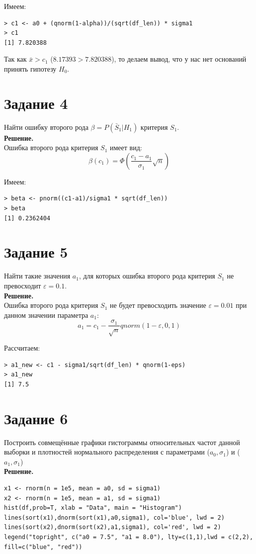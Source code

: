 \documentclass[14pt,a4paper]{scrartcl}
\begin{document}
Имеем:
\begin{verbatim}
> c1 <- a0 + (qnorm(1-alpha))/(sqrt(df_len)) * sigma1
> c1
[1] 7.820388
\end{verbatim}

Так как $\bar{x} > c_1$ ($8.17393 > 7.820388$), то делаем вывод, что у нас нет оснований принять гипотезу $H_0$.


\section*{Задание 4}
Найти ошибку второго рода  $\beta=P(\bar{S}_1|H_1 )$ критерия $S_1$.\\
\textbf{Решение.}\\
Ошибка второго рода критерия $S_1$ имеет вид:
\begin{equation*}
	\beta(c_1) = \Phi(\frac{c_1-a_1}{\sigma_1}\sqrt{n})
\end{equation*}

Имеем:
\begin{verbatim}
> beta <- pnorm((c1-a1)/sigma1 * sqrt(df_len))
> beta
[1] 0.2362404
\end{verbatim}

\section*{Задание 5}
Найти такие значения $a_1$, для которых ошибка второго рода  критерия $S_1$ не превосходит $\varepsilon=0.1$.\\
\textbf{Решение.}\\
Ошибка второго рода критерия $S_1$ не будет превосходить значение $\varepsilon = 0.01$ при данном значении параметра $a_1$:
\begin{equation*}
	a_1 = c_1 - \frac{\sigma_1}{\sqrt{n}}  qnorm(1-\varepsilon,0,1)
\end{equation*}

Рассчитаем:
\begin{verbatim}
> a1_new <- c1 - sigma1/sqrt(df_len) * qnorm(1-eps)
> a1_new
[1] 7.5
\end{verbatim}

\section*{Задание 6}
Построить совмещённые графики гистограммы относительных частот данной выборки и плотностей нормального распределения с параметрами ($a_0,\sigma_1$) и ($a_1,\sigma_1$)\\
\textbf{Решение.}
\begin{verbatim}
x1 <- rnorm(n = 1e5, mean = a0, sd = sigma1)
x2 <- rnorm(n = 1e5, mean = a1, sd = sigma1)
hist(df,prob=T, xlab = "Data", main = "Histogram")
lines(sort(x1),dnorm(sort(x1),a0,sigma1), col='blue', lwd = 2)
lines(sort(x2),dnorm(sort(x2),a1,sigma1), col='red', lwd = 2)
legend("topright", c("a0 = 7.5", "a1 = 8.0"), lty=c(1,1),lwd = c(2,2),
fill=c("blue", "red"))
\end{verbatim}
\end{document}
